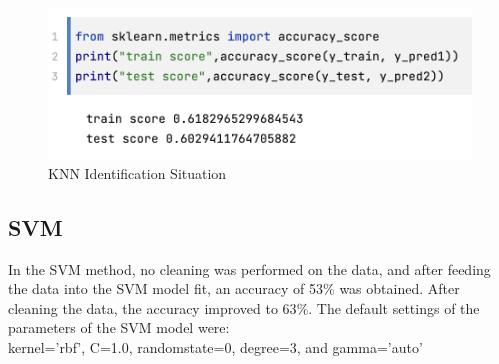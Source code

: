 \documentclass[conference]{IEEEtran}
\begin{document}
{	\begin{figure}[h]
	\label{fig:foo}
	\begin{center}
	\includegraphics[scale=0.35]{KNNResult.png}
	\caption{KNN Identification Situation}
	\end{center}
	\end{figure}

\subsection{SVM}
In the SVM method, no cleaning was performed on the data, and after feeding the data into the SVM model fit, an accuracy of 53$\%$ was obtained. After cleaning the data, the accuracy improved to 63$\%$. The default settings of the parameters of the SVM model were:\\

kernel='rbf', C=1.0, randomstate=0, degree=3, and gamma='auto' \\

}
\end{document}

